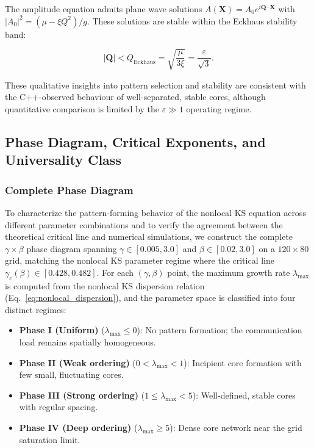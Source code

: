 \documentclass[sn-nature,pdflatex]{sn-jnl}
\begin{document}
The amplitude equation admits plane wave solutions $A(\mathbf{X}) = A_0 e^{i\mathbf{Q}\cdot\mathbf{X}}$ with $|A_0|^2 = (\mu - \xi Q^2)/g$. These solutions are stable within the Eckhaus stability band:

\begin{equation}
|\mathbf{Q}| < Q_{\text{Eckhaus}} = \sqrt{\frac{\mu}{3\xi}} = \frac{\varepsilon}{\sqrt{3}}.
\end{equation}

These qualitative insights into pattern selection and stability are consistent with the C++-observed behaviour of well-separated, stable cores, although quantitative comparison is limited by the $\varepsilon \gg 1$ operating regime.

\subsection{Phase Diagram, Critical Exponents, and Universality Class}
\label{sec:phase_diagram}

\subsubsection{Complete Phase Diagram}

To characterize the pattern-forming behavior of the nonlocal KS equation across different parameter combinations and to verify the agreement between the theoretical critical line and numerical simulations, we construct the complete $\gamma \times \beta$ phase diagram spanning $\gamma \in [0.005, 3.0]$ and $\beta \in [0.02, 3.0]$ on a $120 \times 80$ grid, matching the nonlocal KS parameter regime where the critical line $\gamma_c(\beta) \in [0.428, 0.482]$.
For each $(\gamma, \beta)$ point, the maximum growth rate $\lambda_{\max}$ is computed from the nonlocal KS dispersion relation (Eq.~\ref{eq:nonlocal_dispersion}), and the parameter space is classified into four distinct regimes:

\begin{itemize}
  \item \textbf{Phase I (Uniform)} ($\lambda_{\max} \leq 0$): No pattern formation; the communication load remains spatially homogeneous.
  \item \textbf{Phase II (Weak ordering)} ($0 < \lambda_{\max} < 1$): Incipient core formation with few small, fluctuating cores.
  \item \textbf{Phase III (Strong ordering)} ($1 \leq \lambda_{\max} < 5$): Well-defined, stable cores with regular spacing.
  \item \textbf{Phase IV (Deep ordering)} ($\lambda_{\max} \geq 5$): Dense core network near the grid saturation limit.
\end{itemize}
\end{document}
